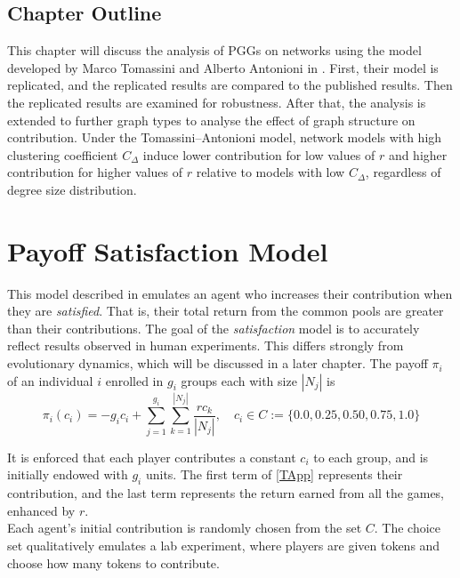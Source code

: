 

\subsection{Chapter Outline}
This chapter will discuss the analysis of PGGs on networks using the model developed by Marco Tomassini and Alberto Antonioni in \cite{RN49}. First, their model is replicated, and the replicated results are compared to the published results. Then the replicated results are examined for robustness. After that, the analysis is extended to further graph types to analyse the effect of graph structure on contribution. Under the Tomassini--Antonioni model, network models with high clustering coefficient $C_\Delta$ induce lower contribution for low values of $r$ and higher contribution for higher values of $r$ relative to models with low $C_\Delta$, regardless of degree size distribution. 

\section{Payoff Satisfaction Model}
This model described in \cite{RN49} emulates an agent who increases their contribution when they are \emph{satisfied}. That is, their total return from the common pools are greater than their contributions. The goal of the \emph{satisfaction} model is to accurately reflect results observed in human experiments. This differs strongly from evolutionary dynamics, which will be discussed in a later chapter. The payoff $\pi_i$ of an individual $i$ enrolled in $g_i$ groups each with size $|N_j|$ is \\
\begin{equation}
    \pi_i(c_i) = - g_ic_i + \sum_{j=1}^{g_i} \sum_{k=1}^{|N_j|} \frac{rc_k}{|N_j|}, \quad c_i \in C:= \{0.0, 0.25, 0.50, 0.75, 1.0\} \label{TApp}
\end{equation}

It is enforced that each player contributes a constant $c_i$ to each group, and is initially endowed with $g_i$ units. The first term of \eqref{TApp} represents their contribution, and the last term represents the return earned from all the games, enhanced by $r$. \\

Each agent's initial contribution is randomly chosen from the set $C$. The choice set qualitatively emulates a lab experiment, where players are given tokens and choose how many tokens to contribute. \\

